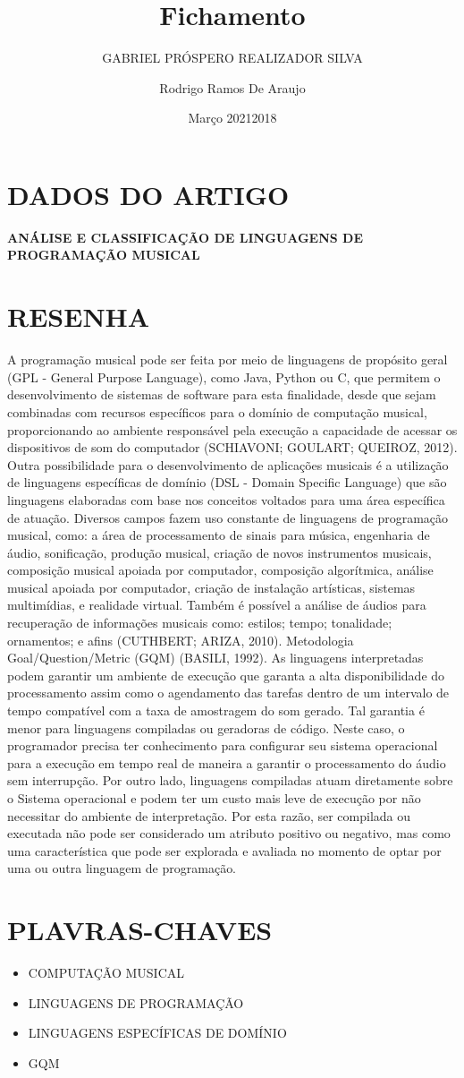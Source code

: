 \documentclass{article}
\title{Fichamento}
\author{GABRIEL PRÓSPERO REALIZADOR  SILVA}
\date{Março 2021}
\begin{document}
\maketitle

\section{DADOS DO ARTIGO}
\textbf{ANÁLISE E CLASSIFICAÇÃO DE LINGUAGENS DE PROGRAMAÇÃO MUSICAL \\}
\author{Rodrigo Ramos De Araujo \\}
\date{2018}

\section{RESENHA}
 A programação musical pode ser feita por meio de linguagens de propósito geral (GPL - General Purpose Language), como Java, Python ou C, que permitem o desenvolvimento de sistemas de software para esta finalidade, desde que sejam combinadas com recursos específicos para o domínio de computação musical, proporcionando ao ambiente responsável pela execução a capacidade de acessar os dispositivos de som do computador (SCHIAVONI; GOULART; QUEIROZ, 2012). 
 Outra possibilidade para o desenvolvimento de aplicações musicais é a utilização de linguagens específicas de domínio (DSL - Domain Specific Language) que são linguagens elaboradas com base nos conceitos voltados para uma área específica de atuação. 
 Diversos campos fazem uso constante de linguagens de programação musical, como: a área de processamento de sinais para música, engenharia de áudio, sonificação, produção musical, criação de novos instrumentos musicais, composição musical apoiada por computador, composição algorítmica, análise musical apoiada por computador, criação de instalação artísticas, sistemas multimídias, e realidade virtual. 
 Também é possível a análise de áudios para recuperação de informações musicais como: estilos; tempo; tonalidade; ornamentos; e afins (CUTHBERT; ARIZA, 2010). 
 Metodologia Goal/Question/Metric (GQM) (BASILI, 1992). 
 As linguagens interpretadas podem garantir um ambiente de execução que garanta a alta disponibilidade do processamento assim como o agendamento das tarefas dentro de um intervalo de tempo compatível com a taxa de amostragem do som gerado. 
 Tal garantia é menor para linguagens compiladas ou geradoras de código. 
 Neste caso, o programador precisa ter conhecimento para configurar seu sistema operacional para a execução em tempo real de maneira a garantir o processamento do áudio sem interrupção. 
 Por outro lado, linguagens compiladas atuam diretamente sobre o Sistema operacional e podem ter um custo mais leve de execução por não necessitar do ambiente de interpretação. 
 Por esta razão, ser compilada ou executada não pode ser considerado um atributo positivo ou negativo, mas como uma característica que pode ser explorada e avaliada no momento de optar por uma ou outra linguagem de programação. 

\section{PLAVRAS-CHAVES}
\begin{itemize}
    \item COMPUTAÇÃO MUSICAL
    \item LINGUAGENS DE PROGRAMAÇÃO
    \item LINGUAGENS ESPECÍFICAS DE DOMÍNIO
    \item GQM
\end{itemize}
\end{document}
